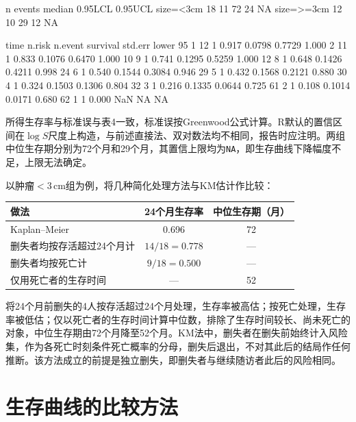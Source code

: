 \begin{routput}
            n events median 0.95LCL 0.95UCL
size=<3cm  18     11     72      24      NA
size=>=3cm 12     10     29      12      NA

 time n.risk n.event survival std.err lower 95%
    1     12       1    0.917  0.0798       0.7729        1.000
    2     11       1    0.833  0.1076       0.6470        1.000
   10      9       1    0.741  0.1295       0.5259        1.000
   12      8       1    0.648  0.1426       0.4211        0.998
   24      6       1    0.540  0.1544       0.3084        0.946
   29      5       1    0.432  0.1568       0.2121        0.880
   30      4       1    0.324  0.1503       0.1306        0.804
   32      3       1    0.216  0.1335       0.0644        0.725
   61      2       1    0.108  0.1014       0.0171        0.680
   62      1       1    0.000     NaN           NA           NA
\end{routput}
所得生存率与标准误与表4一致，标准误按Greenwood公式计算。R默认的置信区间在$\log S$尺度上构造，与前述直接法、双对数法均不相同，报告时应注明。两组中位生存期分别为72个月和29个月，其置信上限均为\texttt{NA}，即生存曲线下降幅度不足，上限无法确定。

\begin{sikao}[删失数据处理方式的比较]
以肿瘤$<3$\,cm组为例，将几种简化处理方法与KM估计作比较：
\begin{center}\small
\begin{tabular}{lcc}\toprule
做法&24个月生存率&中位生存期（月）\\\midrule
Kaplan--Meier&0.696&72\\
删失者均按存活超过24个月计&$14/18=0.778$&---\\
删失者均按死亡计&$9/18=0.500$&---\\
仅用死亡者的生存时间&---&52\\\bottomrule
\end{tabular}
\end{center}
将24个月前删失的4人按存活超过24个月处理，生存率被高估；按死亡处理，生存率被低估；仅以死亡者的生存时间计算中位数，排除了生存时间较长、尚未死亡的对象，中位生存期由72个月降至52个月。KM法中，删失者在删失前始终计入风险集，作为各死亡时刻条件死亡概率的分母，删失后退出，不对其此后的结局作任何推断。该方法成立的前提是独立删失，即删失者与继续随访者此后的风险相同。
\end{sikao}
\section{生存曲线的比较方法}
